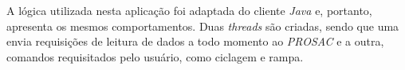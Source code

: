 A lógica utilizada nesta aplicação foi adaptada do cliente \textit{Java} e,
portanto, apresenta os mesmos comportamentos. Duas \textit{threads} são criadas,
sendo que uma envia requisições de leitura de dados a todo momento ao
\textit{PROSAC} e a outra, comandos requisitados pelo usuário, como ciclagem e
rampa.
